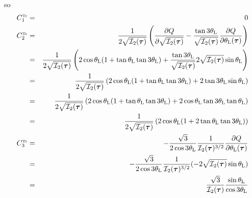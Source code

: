 so
\begin{eqnarray}
C_1^{\text{\tiny Tr}} &=& 0 \\ 
C_2^{\text{\tiny Tr}} 
&=& \frac{1}{2 \sqrt{ {\cal I}_2(\bm\tau)}   }   
\left( \frac{\partial Q}{\partial \sqrt{{\cal I}_2(\bm\tau)}} 
- \frac{\tan 3\theta_{\rm L}}{\sqrt {{\cal I}_2(\bm\tau)}}
\frac{\partial Q}{\partial \theta_{\rm L}(\bm\tau)}  
\right) \nonumber\\
&=&
\frac{1}{2 \sqrt{ {\cal I}_2(\bm\tau)}   }   
\left( 2 \cos\theta_{\rm L} ( 1 + \tan\theta_{\rm L}  \tan 3\theta_{\rm L})
+ \frac{\tan 3\theta_{\rm L}}{\sqrt {{\cal I}_2(\bm\tau)}}
2\sqrt{ {\cal I}_2({\bm \tau})  } \sin \theta_{\rm L} 
\right) \nonumber\\
&=&
\frac{1}{2 \sqrt{ {\cal I}_2(\bm\tau)}   }   
\left( 2 \cos\theta_{\rm L} ( 1 + \tan\theta_{\rm L}  \tan 3\theta_{\rm L})
+ 2 \tan 3\theta_{\rm L} \sin \theta_{\rm L} \right) \nonumber\\
&=&
\frac{1}{2 \sqrt{ {\cal I}_2(\bm\tau)}   }   
\left( 2 \cos\theta_{\rm L} ( 1 + \tan\theta_{\rm L}  \tan 3\theta_{\rm L})
+ 2 \cos\theta_{\rm L} \tan 3\theta_{\rm L}  \tan \theta_{\rm L} 
\right) \nonumber\\
&=&
\frac{1}{2 \sqrt{ {\cal I}_2(\bm\tau)}   }   
\left( 2 \cos\theta_{\rm L} ( 1 + 2 \tan\theta_{\rm L}  \tan 3\theta_{\rm L}) \right) \\
C_3^{\text{\tiny Tr}} 
&=&  - \frac{\sqrt{3}}{2\cos 3\theta_{\rm L}}
\frac{1}{{\cal I}_2(\bm\tau)^{3/2}} 
\frac{\partial Q}{\partial \theta_{\rm L}(\bm\tau)} \nonumber\\
&=&  -
\frac{\sqrt{3}}{2\cos 3\theta_{\rm L}}
\frac{1}{{\cal I}_2(\bm\tau)^{3/2}} 
(-2\sqrt{ {\cal I}_2({\bm \tau})  } \sin \theta_{\rm L} ) \nonumber\\
&=& \frac{\sqrt{3}}{{\cal I}_2({\bm \tau}) }
\frac{\sin\theta_{\rm L} }{\cos 3\theta_{\rm L}}
\end{eqnarray}

































\newpage
